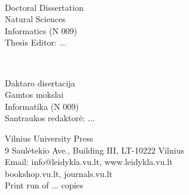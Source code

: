 \pagestyle{empty}
\cleardoublepage

\begin{flushleft}
    \thesisAuthorName \ \thesisAuthorSurname
    	
    \thesisTitleEN
    
    Doctoral Dissertation\\
    Natural Sciences\\
    Informatics (N 009)\\
    Thesis Editor: ...
    
    \vspace{2cm}
    \thesisAuthorName \ \thesisAuthorSurname
    
    \thesisTitleLT
    
    Daktaro disertacija\\
    Gamtos mokslai\\
    Informatika (N 009)\\
    Santraukos redaktorė: ...
\end{flushleft}

\vspace{165mm}
{
	\vspace*{\fill}
	
	\centering
    Vilnius University Press\\
    9 Saulėtekio Ave., Building III, LT-10222 Vilnius\\
    Email: info@leidykla.vu.lt, www.leidykla.vu.lt\\
    bookshop.vu.lt, journals.vu.lt \\
    Print run of ... copies\\
    
}